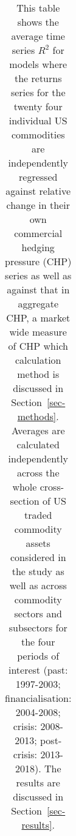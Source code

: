 \documentclass[
  authoryear,
  preprint,
  3p]{elsarticle}
\begin{document}
\begin{longtable}[t]{>{}l>{}l>{}l>{}r>{}r>{}r>{}r}
\end{longtable}

\endgroup{}

\newpage

\begingroup\fontsize{7}{9}\selectfont

\begin{longtable}[t]{>{}l>{}l>{}l>{}r>{}r>{}r>{}r}

\caption{\label{tbl-time-reg-US-CHP}This table shows the average time
series \(R^{2}\) for models where the returns series for the twenty four
individual US commodities are independently regressed against relative
change in their own commercial hedging pressure (CHP) series as well as
against that in aggregate CHP, a market wide measure of CHP which
calculation method is discussed in Section~\ref{sec-methods}. Averages
are calculated independently across the whole cross-section of US traded
commodity assets considered in the study as well as across commodity
sectors and subsectors for the four periods of interest (past:
1997-2003; financialisation: 2004-2008; crisis: 2008-2013; post-crisis:
2013-2018). The results are discussed in Section~\ref{sec-results}.}

\tabularnewline


\end{longtable}
\end{document}
